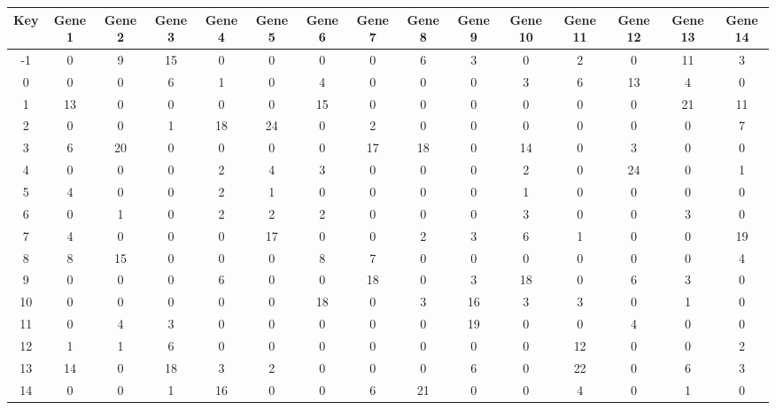 \begin{tabular}{|c|c|c|c|c|c|c|c|c|c|c|c|c|c|c|}
\hline
Key & Gene 1 & Gene 2 & Gene 3 & Gene 4 & Gene 5 & Gene 6 & Gene 7 & Gene 8 & Gene 9 & Gene 10 & Gene 11 & Gene 12 & Gene 13 & Gene 14 \\
\hline
-1 & 0 & 9 & 15 & 0 & 0 & 0 & 0 & 6 & 3 & 0 & 2 & 0 & 11 & 3 \\
0 & 0 & 0 & 6 & 1 & 0 & 4 & 0 & 0 & 0 & 3 & 6 & 13 & 4 & 0 \\
1 & 13 & 0 & 0 & 0 & 0 & 15 & 0 & 0 & 0 & 0 & 0 & 0 & 21 & 11 \\
2 & 0 & 0 & 1 & 18 & 24 & 0 & 2 & 0 & 0 & 0 & 0 & 0 & 0 & 7 \\
3 & 6 & 20 & 0 & 0 & 0 & 0 & 17 & 18 & 0 & 14 & 0 & 3 & 0 & 0 \\
4 & 0 & 0 & 0 & 2 & 4 & 3 & 0 & 0 & 0 & 2 & 0 & 24 & 0 & 1 \\
5 & 4 & 0 & 0 & 2 & 1 & 0 & 0 & 0 & 0 & 1 & 0 & 0 & 0 & 0 \\
6 & 0 & 1 & 0 & 2 & 2 & 2 & 0 & 0 & 0 & 3 & 0 & 0 & 3 & 0 \\
7 & 4 & 0 & 0 & 0 & 17 & 0 & 0 & 2 & 3 & 6 & 1 & 0 & 0 & 19 \\
8 & 8 & 15 & 0 & 0 & 0 & 8 & 7 & 0 & 0 & 0 & 0 & 0 & 0 & 4 \\
9 & 0 & 0 & 0 & 6 & 0 & 0 & 18 & 0 & 3 & 18 & 0 & 6 & 3 & 0 \\
10 & 0 & 0 & 0 & 0 & 0 & 18 & 0 & 3 & 16 & 3 & 3 & 0 & 1 & 0 \\
11 & 0 & 4 & 3 & 0 & 0 & 0 & 0 & 0 & 19 & 0 & 0 & 4 & 0 & 0 \\
12 & 1 & 1 & 6 & 0 & 0 & 0 & 0 & 0 & 0 & 0 & 12 & 0 & 0 & 2 \\
13 & 14 & 0 & 18 & 3 & 2 & 0 & 0 & 0 & 6 & 0 & 22 & 0 & 6 & 3 \\
14 & 0 & 0 & 1 & 16 & 0 & 0 & 6 & 21 & 0 & 0 & 4 & 0 & 1 & 0 \\
\hline
\end{tabular}